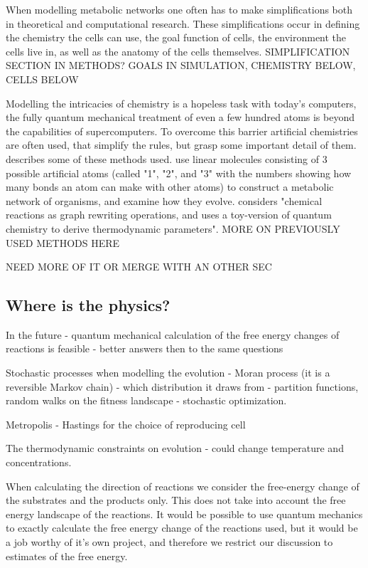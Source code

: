 \documentclass[10pt,a4paper]{article}
\begin{document}
	When modelling metabolic networks one often has to make simplifications both in theoretical and computational research. These simplifications occur in defining the chemistry the cells can use, the goal function of cells, the environment the cells live in, as well as the anatomy of the cells themselves. SIMPLIFICATION SECTION IN METHODS? GOALS IN SIMULATION, CHEMISTRY BELOW, CELLS BELOW
	
	Modelling the intricacies of chemistry is a hopeless task with today's computers, the fully quantum mechanical treatment of even a few hundred atoms is beyond the capabilities of supercomputers. To overcome this barrier artificial chemistries are often used, that simplify the rules, but grasp some important detail of them. \citeauthor{artificialreview} describes some of these methods used. \citeauthor{evolutioncomplex} use linear molecules consisting of 3 possible  artificial atoms (called "1", "2", and "3" with the numbers showing how many bonds an atom can make with other atoms) to construct a metabolic network of organisms, and examine how they evolve. \citeauthor{computationalframework} considers "chemical reactions as graph rewriting operations, and uses a toy-version of quantum chemistry to derive thermodynamic parameters". MORE ON PREVIOUSLY USED METHODS HERE
	
	NEED MORE OF IT OR MERGE WITH AN OTHER SEC

	
	\subsection{Where is the physics?}\label{chap:whereisphysics}

	In the future - quantum mechanical calculation of the free energy changes of reactions is feasible - better answers then to the same questions

	Stochastic processes when modelling the evolution - Moran process  (it is a reversible Markov chain) - which distribution it draws from - partition functions, random walks on the fitness landscape - stochastic optimization. 

	Metropolis - Hastings for the choice of reproducing cell
	
	The thermodynamic constraints on evolution - could change temperature and concentrations. 

	
	
	When calculating the direction of reactions we consider the free-energy change of the substrates and the products only. This does not take into account the free energy landscape of the reactions. It would be possible to use quantum mechanics to exactly calculate the free energy change of the reactions used, but it would be a job worthy of it's own project, and therefore we restrict our discussion to estimates of the free energy.
	
\end{document}
